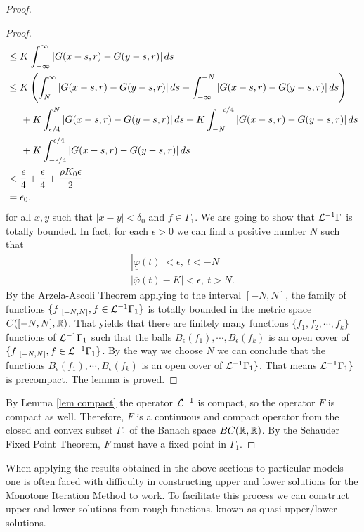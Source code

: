 \documentclass[12pt,letterpaper]{amsart}
\theoremstyle{definition}
\theoremstyle{remark}
\numberwithin{equation}{section}
\begin{document}
\begin{proof}
\begin{proof}
\begin{align*}
		&\le K \int^\infty_{-\infty}\left| G(x-s,r)-G(y-s,r)\right| ds\\
		&\le K\left( \int^\infty _N \left| G(x-s,r)-G(y-s,r)\right| ds +\int^{-N}_{-\infty} \left| G(x-s,r)-G(y-s,r)\right| ds\right) \\
		& \hspace{.5cm} +  K  \int^N_{\epsilon/4} \left| G(x-s,r)-G(y-s,r)\right| ds     +K  \int_{-N}^{-\epsilon/4}\left| G(x-s,r)-G(y-s,r)\right| ds  \\
		&\hspace{.5cm} + K  \int_{-\epsilon/4}^{\epsilon/4} \left| G(x-s,r)-G(y-s,r)\right| ds       \\
		&<  \frac{\epsilon}{4} +  \frac{\epsilon}{4} +\frac{\rho K_0\epsilon}{2}\\
		&= \epsilon_0,
	\end{align*}
	for all $x,y$ such that $|x-y|<\delta_0$ and $f\in \Gamma_1$. We are going to show that ${\cal L}^{-1}\Gamma$ is totally bounded. In fact, for each $\epsilon>0$ we can find a positive number $N$ such that 
	\begin{align*}
		| \underline \varphi (t) | < \epsilon , \ t < -N\\
		|\overline \varphi (t)-K| <\epsilon ,\ t > N .
	\end{align*}
	By the Arzela-Ascoli Theorem applying to the interval $[-N,N]$, the family of functions $\{f|_{[-N,N]}, f\in {\cal L}^{-1}\Gamma_1\}$ is totally bounded in the metric space $C([-N,N],\R)$. That yields that there are finitely many functions $\{f_1,f_2,\cdots , f_k\}$ functions of $ {\cal L}^{-1}\Gamma_1$ such that the balls $B_\epsilon (f_1),\cdots , B_\epsilon (f_k)$ is an open cover of $\{f|_{[-N,N]}, f\in {\cal L}^{-1}\Gamma_1\}$. By the way we choose $N$ we can conclude that the functions $B_\epsilon (f_1),\cdots , B_\epsilon (f_k)$ is an open cover of ${\cal L}^{-1}\Gamma_1\}$. That means ${\cal L}^{-1}\Gamma_1\}$ is precompact. The lemma is proved.
\end{proof}

\medskip
By Lemma \ref{lem compact}  the operator ${\cal L}^{-1}$ is compact, so the operator $F$ is compact as well. Therefore, $F$ is a continuous and compact operator from the closed and convex subset $\Gamma_1$ of the Banach space $BC(\R,\R)$. By the Schauder Fixed Point Theorem, $F$ must have a fixed point in $\Gamma_1$.
\end{proof}
When applying the results obtained in the above sections to particular models one is often faced with difficulty in constructing upper and lower solutions for the Monotone Iteration Method to work. To facilitate this process we can construct upper and lower solutions from rough functions, known as quasi-upper/lower solutions.
\end{document}
